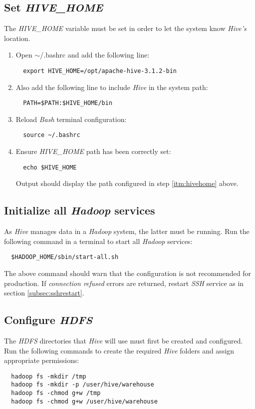 \documentclass{article}
\begin{document}
  \subsection{Set \emph{HIVE\_HOME}}
  The \emph{HIVE\_HOME} variable must be set in order to let the system know \emph{Hive's}
  location.
  \begin{enumerate}
  \item Open $\sim$/.bashrc and add the following line:
  \label{itm:hivehome}
  \begin{verbatim}
  export HIVE_HOME=/opt/apache-hive-3.1.2-bin
  \end{verbatim}

  \item Also add the following line to include \emph{Hive} in the system path:
  \begin{verbatim}
  PATH=$PATH:$HIVE_HOME/bin
  \end{verbatim}

  \item Reload \emph{Bash} terminal configuration:
  \begin{verbatim}
  source ~/.bashrc
  \end{verbatim}
  
  \item Ensure \emph{HIVE\_HOME} path has been correctly set:
  \begin{verbatim}
  echo $HIVE_HOME
  \end{verbatim}
  Output should display the path configured in step \ref{itm:hivehome} above.
  \end{enumerate}

  \subsection{Initialize all \emph{Hadoop} services}
  \label{subsec:hadoopall}
  As \emph{Hive} manages data in a \emph{Hadoop} system, the latter must be running.
  Run the following command in a terminal to start all \emph{Hadoop} services:
  \begin{verbatim}
  $HADOOP_HOME/sbin/start-all.sh
  \end{verbatim}
  The above command should warn that the configuration is not recommended for production.
  If \emph{connection refused} errors are returned, restart \emph{SSH} service as
  in section \ref{subsec:sshrestart}.

  \subsection{Configure \emph{HDFS}}
  The \emph{HDFS} directories that \emph{Hive} will use must first be created and configured.
  Run the following commands to create the required \emph{Hive} folders and assign appropriate
  permissions:
  \begin{verbatim}
  hadoop fs -mkdir /tmp 
  hadoop fs -mkdir -p /user/hive/warehouse 
  hadoop fs -chmod g+w /tmp 
  hadoop fs -chmod g+w /user/hive/warehouse
  \end{verbatim}
\end{document}
